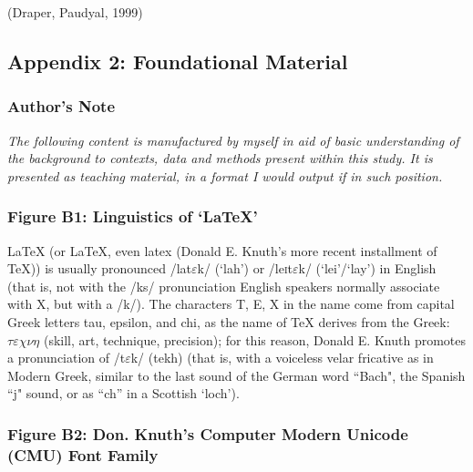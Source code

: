 \documentclass[11pt, english]{article}
\begin{document}
			\begin{center}
                        \end{center}

			(Draper, Paudyal, 1999)


	\subsection*{Appendix 2: Foundational Material}

		\subsubsection*{Author's Note}

			\textit{The following content is manufactured by myself in aid of basic understanding of the background to contexts, data and methods present within this study. It is presented as teaching material, in a format I would output if in such position.}
		\subsubsection*{Figure B1: Linguistics of `{\LaTeX}'}

		{\LaTeX} (or LaTeX, even latex (Donald E. Knuth's more recent installment of {\TeX})) is usually pronounced /la\textlengthmark t$\varepsilon$k/ (`lah') or /le\textsc{i}t$\varepsilon$k/ (`lei'/`lay') in English (that is, not with the /ks/ pronunciation English speakers normally associate with X, but with a /k/). The characters T, E, X in the name come from capital Greek letters tau, epsilon, and chi, as the name of {\TeX} derives from the Greek: $\tau\varepsilon\chi\nu\eta$ (skill, art, technique, precision); for this reason, Donald E. Knuth promotes a pronunciation of /t$\varepsilon$k/ (tekh) (that is, with a voiceless velar fricative as in Modern Greek, similar to the last sound of the German word ``Bach", the Spanish ``j" sound, or as ``ch'' in a Scottish `loch'). 

		\subsubsection*{Figure B2: Don. Knuth's Computer Modern Unicode (CMU) Font Family}
\end{document}

